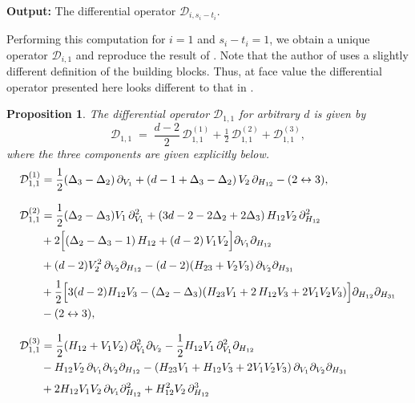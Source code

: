 \documentclass[12pt,a4paper]{extarticle}
\newtheorem{proposition}[theorem]{Proposition}
\theoremstyle{definition}
\begin{document}
\noindent\textbf{Output:} The differential operator $\mathcal{D}_{i,s_i-t_i}$.\newline

Performing this computation for $i=1$ and $s_i-t_i=1$, we obtain a unique operator $\mathcal{D}_{i,1}$ and reproduce the result of \cite{Zhiboedov}.
Note that the author of \cite{Zhiboedov} uses a slightly different definition of the building blocks.
Thus, at face value the differential operator presented here looks different to that in \cite[Appendix A]{Zhiboedov}.

\begin{proposition}
    The differential operator $\mathcal{D}_{1,1}$ for arbitrary $d$ is given by
    \begin{equation}
    \mathcal{D}_{1,1} \;=\; \frac{d-2}{2}\,\mathcal{D}_{1,1}^{(1)} + \tfrac{1}{2}\,\mathcal{D}_{1,1}^{(2)} + \mathcal{D}_{1,1}^{(3)},
\end{equation}
where the three components are given explicitly below.
\begin{align}
\mathcal{D}^{(1)}_{1,1} &=
    \frac{1}{2}(\Delta_3 - \Delta_2)\,\partial_{V_1}
    + (d - 1 + \Delta_3 - \Delta_2)\,V_2 \,\partial_{H_{12}}
    - (2\leftrightarrow 3),\\[8pt]
%
%
\mathcal{D}_{1,1}^{(2)} &= 
    \frac{1}{2}(\Delta_2 - \Delta_3) V_1\,\partial_{V_1}^2 + (3d - 2 - 2\Delta_2 + 2\Delta_3)\, H_{12} V_2\,\partial_{H_{12}}^2 \notag\\
&+ 2\Big[(\Delta_2 - \Delta_3 - 1)\, H_{12} + (d-2)\,V_1 V_2\Big]\partial_{V_1}\partial_{H_{12}} \notag\\[3pt]
&+ (d-2)V_2^2\,\partial_{V_2}\partial_{H_{12}}
 - (d-2)(H_{23} + V_2 V_3)\,\partial_{V_2}\partial_{H_{31}} \notag\\[3pt]
&+ \frac{1}{2}\Big[
    3(d-2)H_{12}V_3
    - (\Delta_2 - \Delta_3)(H_{23}V_1  + 2 \,H_{12}V_3 + 2V_1 V_2 V_3)
  \Big]\partial_{H_{12}}\partial_{H_{31}} \notag\\
& - (2\leftrightarrow3), \notag \\[8pt]
%
%
\mathcal{D}_{1,1}^{(3)} &= 
    \frac{1}{2}(H_{12} + V_1 V_2)\,\partial_{V_1}^2\partial_{V_2} - \frac{1}{2}H_{12} V_1\,\partial_{V_1}^2\partial_{H_{12}} \notag\\
&- H_{12} V_2\,\partial_{V_1}\partial_{V_2}\partial_{H_{12}}
  - (H_{23}V_1 + H_{12}V_3 + 2V_1 V_2 V_3)\,\partial_{V_1}\partial_{V_2}\partial_{H_{31}} \notag\\[3pt]
&+ 2H_{12} V_1 V_2\,\partial_{V_1}\partial_{H_{12}}^2 
 + H_{12}^2 V_2\,\partial_{H_{12}}^3 \notag\\[3pt]

\end{align}
\end{proposition}
\end{document}
